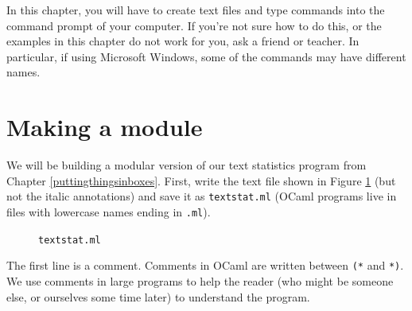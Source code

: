 \documentclass[]{book}
\begin{document}
In this chapter, you will have to create text files and type commands into the command prompt of your computer. If you're not sure how to do this, or the examples in this chapter do not work for you, ask a friend or teacher. In particular, if using Microsoft Windows, some of the commands may have different names.

\section*{Making a module}

We will be building a modular version of our text statistics program from Chapter \ref{puttingthingsinboxes}. First, write the text file shown in Figure \ref{textstat.ml} (but not the italic annotations) and save it as \texttt{textstat.ml} (OCaml programs live in files with lowercase names ending in \texttt{.ml}).

\begin{figure}
\begin{center}
\end{center}
\caption{\small \texttt{textstat.ml}}
\label{textstat.ml}
\end{figure}

The first line is a comment. Comments in OCaml are written between \texttt{(*} and \texttt{*)}. We use comments in large programs to help the reader (who might be someone else, or ourselves some time later) to understand the program.
\end{document}
